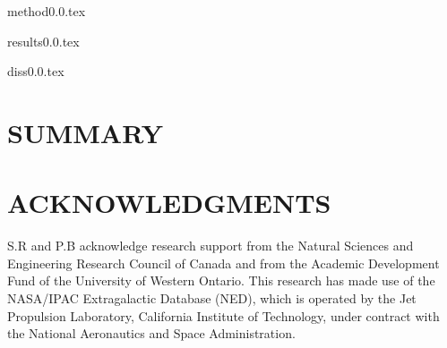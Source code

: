 \documentclass[useAMS,usenatbib]{mn2e}
\begin{document}
{method0.0.tex}

{results0.0.tex}

{diss0.0.tex}

\section{SUMMARY}

\section*{ACKNOWLEDGMENTS}
S.R and P.B acknowledge research support from the Natural Sciences and Engineering Research Council of Canada and from the Academic Development Fund of the University of Western Ontario. This research has made use of the NASA/IPAC Extragalactic Database (NED), which is operated by the Jet Propulsion Laboratory, California Institute of Technology, under contract with the National Aeronautics and Space Administration.


\end{document}
